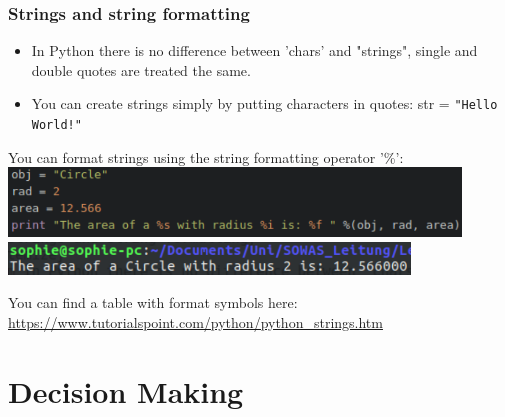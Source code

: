 \documentclass{beamer}
\begin{document}
\begin{frame}
\frametitle{Strings and string formatting}
	\begin{itemize}
		\item In Python there is no difference between 'chars' and "strings", single and double quotes are treated the same.
		\item You can create strings simply by putting characters in quotes: str = \texttt{"Hello World!"}
	\end{itemize}
	You can format strings using the string formatting operator '\%': \\
	\includegraphics[width = 0.9\textwidth]{StringFormat.pdf} \\
	\includegraphics[width = 0.8\textwidth]{StringFormatOutput.pdf}
	
	You can find a table with format symbols here: \url{https://www.tutorialspoint.com/python/python_strings.htm}
\end{frame}


\section{Decision Making}
\end{document}
